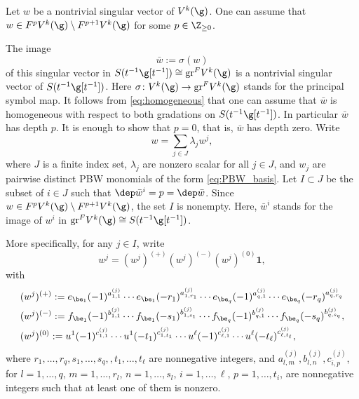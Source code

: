 Let $w$ be a nontrivial singular vector of $V^k(\g)$.
One can assume that $w \in F^p V^k(\g) \setminus F^{p+1} V^k(\g)$ for
some $p\in \Z_{\geq 0}$.

The image
\[
\bar{w}:=\sigma(w)
\]
of this singular vector in $S(t^{-1}\g[t^{-1}]) \cong \mathrm{gr}^F V^k(\g)$
is a nontrivial singular vector of $S(t^{-1}\g[t^{-1}])$.
Here $\sigma \colon V^k(\g) \to \mathrm{gr}^F V^k(\g)$
stands for the principal symbol map.
It follows from \eqref{eq:homogeneous}
that one can assume that $\bar{w}$ is homogeneous with respect to both gradations
on $S(t^{-1}\g[t^{-1}])$.
In particular $\bar w$ has depth $p$. It is enough to show that
$p=0$, that is, $\bar w$ has depth zero.
Write
\[
w = \sum_{j \in J} \lambda_j w^j,
\]
where $J$ is a finite index set, $\lambda_j $ are nonzero
scalar for all $j \in J$,
and $w_j$ are pairwise distinct PBW monomials of the form \eqref{eq:PBW_basis}.
Let $I \subset J$ be the subset of $i \in J$ such that $\dep \bar w^{i} = p = \dep \bar w$.
Since $w \in F^p V^k(\g) \setminus F^{p+1} V^k(\g)$,
the set $I$ is nonempty.
Here, $\bar{w}^{i}$ stands for the image of $w^{i}$ in $\mathrm{gr}^F V^k(\g) \cong S(t^{-1}\g[t^{-1}])$.

More specifically, for any $j \in I$, write
\begin{equation}
\label{eq:PBW_w_i}
w^{j} = (w^{j})^{(+)} (w^{j})^{(-)} (w^{j})^{(0)} \mathbf{1},
\end{equation}
with
\begin{align*}
& (w^{j})^{(+)} := e_{\be_{1}}(-1)^{a_{1,1}^{(j)}}\cdots
e_{\be_{1}} (- r_1)^{a_{1,r_1}^{(j)}}\cdots
e_{\be_q}(- 1)^{a_{q,1}^{(j)}}\cdots e_{\be_q}(- r_q)^{a_{q,r_q}^{(j)}} \\\nonumber
& (w^{j})^{(-)} : =f_{\be_1}(-1)^{b_{1,1}^{(j)}}\cdots f_{\be_1}(- s_1)^{b_{1,s_1}^{(j)}}\cdots
f_{\be_q}(- 1)^{b_{q,1}^{(j)}}
\cdots f_{\be_q}(- s_q)^{b_{q,s_q}^{(j)}}, \\\nonumber
& (w^{j})^{(0)} := u^1(- 1)^{c_{1,1}^{(j)}}\cdots u^1(- t_1)^{c_{1,t_1}^{(j)}}
\cdots u^\ell (- 1)^{c_{\ell,1}^{(j)}}\cdots u^\ell(- t_\ell)^{c_{\ell, t_\ell}^{(j)}},
\end{align*}
where $r_1,\dots,r_q, s_1,\dots,s_q,,t_1,\dots,t_\ell$
are nonnegative integers, and
$a_{l,m}^{(j)},b_{l,n}^{(j)},c_{i,p}^{(j)}$, for $l =1,\dots,q$,
$m=1,\dots,r_l$, $n=1,\dots,s_l$,
$i =1,\dots,\ell$,
$p=1,\dots,t_i$,
are nonnegative integers such
that at least one of them is nonzero.


